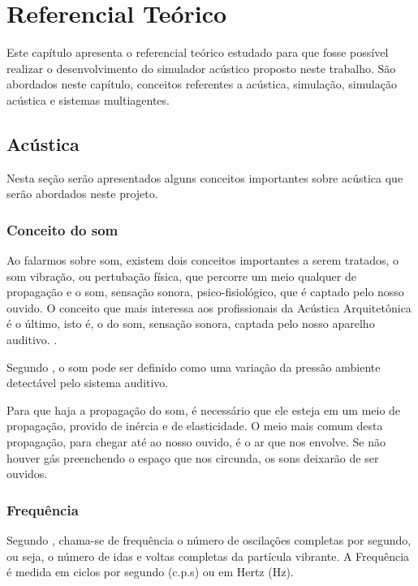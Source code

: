 \chapter{Referencial Teórico}

Este capítulo apresenta o referencial teórico estudado para que fosse possível realizar o desenvolvimento do simulador acústico proposto neste trabalho. São abordados neste capítulo, conceitos referentes a acústica, simulação, simulação acústica e sistemas multiagentes.

\section{Acústica}

Nesta seção serão apresentados alguns conceitos importantes sobre acústica que serão abordados neste projeto.

\subsection{Conceito do som}

Ao falarmos sobre som, existem dois conceitos importantes a serem tratados, o som vibração, ou pertubação física, que percorre um meio qualquer de propagação e o som, sensação sonora, psico-fisiológico, que é captado pelo nosso ouvido. O conceito que mais interessa aos profissionais da Acústica Arquitetônica é o último, isto é, o do som, sensação sonora, captada pelo nosso aparelho auditivo. \cite{silva}.

Segundo , o som pode ser definido como uma variação da pressão ambiente detectável pelo sistema auditivo.

Para que haja a propagação do som, é necessário que ele esteja em um meio de propagação, provido de inércia e de elasticidade. O meio mais comum desta propagação, para chegar até ao nosso ouvido, é o ar que nos envolve. Se não houver gás preenchendo o espaço que nos circunda, os sons deixarão de ser ouvidos. \cite{silva}

\subsection{Frequência}

Segundo , chama-se de frequência o número de oscilações completas por segundo, ou seja, o número de idas e voltas completas da partícula vibrante. A Frequência é medida em ciclos por segundo (c.p.s) ou em Hertz (Hz).

